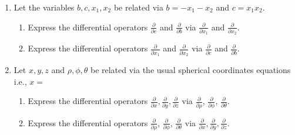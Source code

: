 \begin{enumerate}
\item Let the variables $b,c, x_1, x_2$ be related via $b=-x_1-x_2 $ and $c=x_1 x_2$.
\begin{enumerate}
\item Express the differential operators $\frac{\partial}{\partial c}$ and $\frac{\partial}{\partial b}$ via $\frac{\partial}{\partial x_1}$ and $\frac{\partial}{\partial x_2}$.
\item Express the differential operators  $\frac{\partial}{\partial x_1}$ and $\frac{\partial}{\partial x_2}$ via $\frac{\partial}{\partial c}$ and $\frac{\partial}{\partial b}$. 
\end{enumerate}

\item Let $x,y,z$ and $\rho, \phi,\theta$ be related via the usual spherical coordinates equations i.e., $x= $
\begin{enumerate}
\item \label{problemd/dx,d/dy,d/dzinspherical} Express the differential operators $\frac{\partial }{\partial x}, \frac{\partial }{\partial y}, \frac{\partial}{\partial z}$ via $\frac{\partial }{\partial \rho}$, $\frac{\partial }{\partial \phi}$, $\frac{\partial }{\partial \theta}$.

\item Express the differential operators $\frac{\partial }{\partial \rho}$, $\frac{\partial }{\partial \phi}$, $\frac{\partial }{\partial \theta}$ via $\frac{\partial }{\partial x}, \frac{\partial }{\partial y}, \frac{\partial}{\partial z}$.


\end{enumerate}
\end{enumerate}
